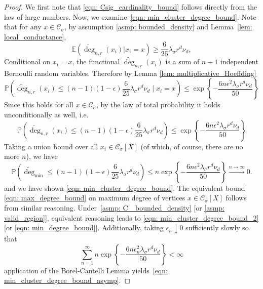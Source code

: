 \documentclass[11pt,twoside]{article}
\newcommand{\set}[1]{\left\{#1\right\}}
\newcommand{\1}{\mathbf{1}}
\newcommand{\Xbf}{X}             %
\newcommand{\Pbb}{\mathbb{P}}
\newcommand{\Ebb}{\mathbb{E}}
\newcommand{\Cset}{\mathcal{C}}
\newcommand{\Csig}{\Cset_{\sigma}}
\newcommand{\degminwt}{\widetilde{\deg}_{\min}}
\begin{document}
\begin{proof}
	We first note that \eqref{eqn: Csig_cardinality_bound} follows directly from the law of large numbers. Now, we examine~\eqref{eqn: min_cluster_degree_bound}. Note that for any $x \in \Csig$, by assumption \ref{asmp: bounded_density} and Lemma~\ref{lem: local_conductance},
	\begin{equation*}
	\Ebb(\widetilde{\deg}_{n,r}(x_i)|x_i = x) \geq \frac{6}{25} \lambda_{\sigma}r^d\nu_d,
	\end{equation*}
	Conditional on $x_i = x$, the functional $\widetilde{\deg}_{n,r}(x_i)$ is a sum of $n - 1$ independent Bernoulli random variables. Therefore by Lemma \ref{lem: multiplicative_Hoeffding}
	\begin{equation*}
	\Pbb\left(\widetilde{\deg}_{n,r}(x_i) \leq (n-1) (1 - \epsilon) \frac{6}{25}  \lambda_{\sigma} r^d \nu_d \mid x_i = x \right) \leq \exp\set{- \frac{6 n \epsilon^2  \lambda_{\sigma} r^d \nu_d}{50} }
	\end{equation*}
	Since this holds for all $x \in \Csig$, by the law of total probability it holds unconditionally as well, i.e.
	\begin{equation*}
	\Pbb\left(\widetilde{\deg}_{n,r}(x_i) \leq (n - 1) (1 - \epsilon) \frac{6}{25}  \lambda_{\sigma} r^d \nu_d \right) \leq \exp\set{- \frac{6 n \epsilon^2  \lambda_{\sigma} r^d \nu_d}{50} }
	\end{equation*}
	Taking a union bound over all $x_i \in \Csig[\Xbf]$ (of which, of course, there are no more $n$), we have
	\begin{equation*}
	\Pbb \left(\degminwt \leq (n - 1) (1 - \epsilon) \frac{6}{25}  \lambda_{\sigma} r^d \nu_d \right) \leq n \exp\set{- \frac{6 n \epsilon^2  \lambda_{\sigma} r^d \nu_d}{50} } \overset{n \to \infty}{\longrightarrow} 0.
	\end{equation*}
	and we have shown \eqref{eqn: min_cluster_degree_bound}. The equivalent bound \eqref{eqn: max_degree_bound} on maximum degree of vertices $x \in \Csig[\Xbf]$ follows from similar reasoning. Under~\ref{asmp: C'_bounded_density} [or \ref{asmp: valid_region}], equivalent reasoning leads to \eqref{eqn: min_cluster_degree_bound_2}[or \eqref{eqn: min_degree_bound}]. Additionally, taking $\epsilon_n \downarrow 0$ sufficiently slowly so that 
	\begin{equation*}
	\sum_{n = 1}^{\infty }n \exp\set{- \frac{6 n \epsilon_n^2  \lambda_{\sigma} r^d \nu_d}{50} } < \infty
	\end{equation*}
	application of the Borel-Cantelli Lemma yields~\eqref{eqn: min_cluster_degree_bound_asymp}.
	

\end{proof}
\end{document}
